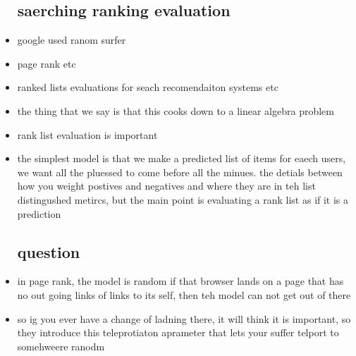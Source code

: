 \documentclass{article}
\begin{document}
\begin{itemize}
\subsection*{saerching ranking evaluation}
\item google used ranom surfer 
\item page rank etc 
\item ranked lists evaluations for seach recomendaiton systems etc
\item the thing that we say is that this cooks down to a linear algebra problem 
\item rank list evaluation is important 
\item the simplest model is that we make a predicted list of items for eaech users, we want all the pluessed to come before all the minues. the detials between how you weight postives and negatives and where they are in teh list distingushed metircs, but the main point is evaluating a rank list as if it is a prediction 
\subsection*{question}
\item in page rank, the model is random if that browser lands on a page that has no out going links of links to its self, then teh model can not get out of there 
\item so ig you ever have a change of ladning there, it will think it is important, so they introduce this teleprotiaton aprameter that lets your suffer telport to somehweere ranodm 

\end{itemize}
\end{document}
